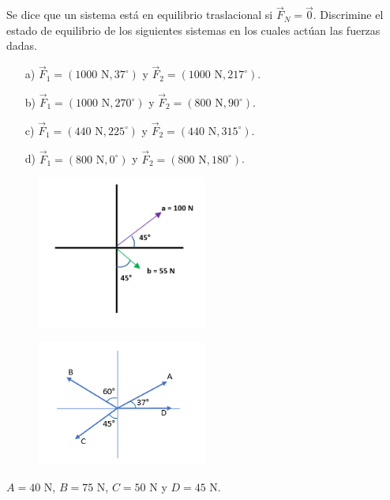 \begin{frame}
    Se dice que un sistema est\'a en equilibrio traslacional si $\vec{F}_N = \vec{0}$. Discrimine el estado de equilibrio de los siguientes sistemas en los cuales actúan las fuerzas dadas.
    
    \begin{itemize}
        \item[a)] $\vec{F}_1 = (1000 \text{ N} , 37^\circ)$ y $\vec{F}_2 = (1000 \text{ N} , 217^\circ)$.
        \item[b)] $\vec{F}_1 = (1000 \text{ N} , 270^\circ)$ y $\vec{F}_2 = (800 \text{ N} , 90^\circ)$.
        \item[c)] $\vec{F}_1 = (440 \text{ N} , 225^\circ)$ y $\vec{F}_2 = (440 \text{ N} , 315^\circ)$.
        \item[d)] $\vec{F}_1 = (800 \text{ N} , 0^\circ)$ y $\vec{F}_2 = (800 \text{ N} , 180^\circ)$.
    \end{itemize}
\end{frame}

    \begin{frame}
    \begin{multicols}{2}
    \begin{figure}[H]
            \includegraphics[width=0.5\textwidth]{figures/Ejercicios-de-suma-de-vectores-1.png}
        \end{figure}
        
        \begin{figure}[H]
        \includegraphics[width=0.5\textwidth]{figures/vectores-30.png}
        \end{figure}
        
        $A = 40 \text{ N}$, $B = 75 \text{ N}$, $C = 50 \text{ N}$ y $D = 45 \text{ N}$.
\end{multicols}
        
    \end{frame}

